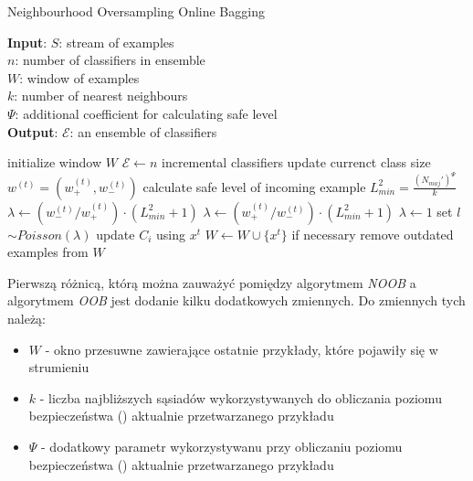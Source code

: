\begin{algorithm}
    \caption{Neighbourhood Oversampling Online Bagging}\label{Algorithm:NOOB}
    \textbf{Input}: $S$: stream of examples \\
    \hspace*{12mm} $n$: number of classifiers in ensemble \\
    \hspace*{12mm} $W$: window of examples \\
    \hspace*{12mm} $k$: number of nearest neighbours \\
    \hspace*{12mm} $\Psi$: additional coefficient for calculating safe level \\
    \textbf{Output}: $\mathcal{E}$: an ensemble of classifiers \\
    \begin{algorithmic}[1]
    \State initialize window $W$
    \State $\mathcal{E} \gets n$ incremental classifiers
    \State update currenct class size $w^{(t)} = (w^{(t)}_{+}, w^{(t)}_{-})$
    \State calculate safe level of incoming example $L^2_{min} = \frac{(N_{maj}')^\Psi}{k}$
    \vspace{0.5em}
    \State $\lambda \gets (w^{(t)}_{-}/w^{(t)}_{+}) \cdot (L^2_{min} + 1)$
    \vspace{0.5em}
    \vspace{0.5em}
    \State $\lambda \gets (w^{(t)}_{+}/w^{(t)}_{-}) \cdot (L^2_{min} + 1)$
    \vspace{0.4em}
    \Else
    \State $\lambda \gets 1$
    \EndIf
    \State set $l$ $\sim Poisson(\lambda)$
    \State update $C_i$ using $x^t$
    \EndFor
    \EndFor
    \State $W \gets W \cup \{x^t\}$
    \State if necessary remove outdated examples from $W$
    \EndFor
    \end{algorithmic}
\end{algorithm}

\noindent Pierwszą różnicą, którą można zauważyć pomiędzy algorytmem \textit{NOOB} a algorytmem \textit{OOB} jest dodanie kilku dodatkowych zmiennych. Do zmiennych tych należą:

\begin{itemize}
    \item $W$ - okno przesuwne zawierające ostatnie przykłady, które pojawiły się w strumieniu
    \item $k$ - liczba najbliższych sąsiadów wykorzystywanych do obliczania poziomu bezpieczeństwa () aktualnie przetwarzanego przykładu
    \item $\Psi$ - dodatkowy parametr wykorzystywanu przy obliczaniu poziomu bezpieczeństwa () aktualnie przetwarzanego przykładu
\end{itemize}

